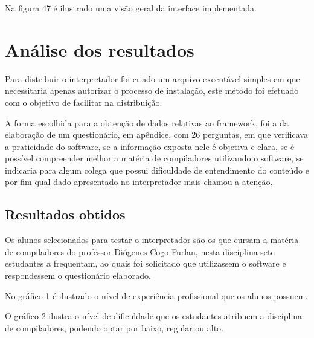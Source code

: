 \documentclass[12pt,oneside,a4paper,chapter=TITLE,section=TITLE,sumario=tradicional]{abntex2}
\begin{document}
Na figura 47 é ilustrado uma visão geral da interface implementada. 

\begin{figure}[htb]
\end{figure}


\chapter{Análise dos resultados}
\label{cap:analiseresultados}

Para distribuir o interpretador foi criado um arquivo executável simples em que necessitaria apenas autorizar o processo de instalação, este método foi efetuado com o objetivo de facilitar na distribuição.

A forma escolhida para a obtenção de dados relativas ao framework, foi a da elaboração de um questionário, em apêndice, com 26 perguntas, em que verificava a praticidade do software, se a informação exposta nele é objetiva e clara, se é possível compreender melhor a matéria de compiladores utilizando o software, se indicaria para algum colega que possui dificuldade de entendimento do conteúdo e por fim qual dado apresentado no interpretador mais chamou a atenção.

\section{Resultados obtidos}
\label{sec:resultados}

Os alunos selecionados para testar o interpretador são os que cursam a matéria de compiladores do professor Diógenes Cogo Furlan, nesta disciplina sete estudantes a frequentam, ao quais foi solicitado que utilizassem o software e respondessem o questionário elaborado.

No gráfico 1 é ilustrado o nível de experiência profissional que os alunos possuem.

\begin{grafico}[H]
\end{grafico}

O gráfico 2 ilustra o nível de dificuldade que os estudantes atribuem a disciplina de compiladores, podendo optar por baixo, regular ou alto.
\end{document}
